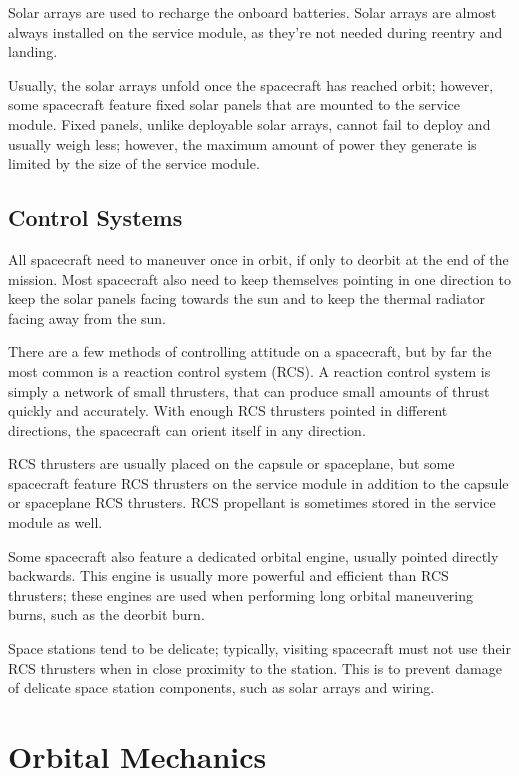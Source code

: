 \documentclass[oneside,a5paper]{book}
\begin{document}
Solar arrays are used to recharge the onboard batteries. Solar arrays
are almost always installed on the service module, as they’re not
needed during reentry and landing.

Usually, the solar arrays unfold once the spacecraft has reached
orbit; however, some spacecraft feature fixed solar panels that are
mounted to the service module. Fixed panels, unlike deployable solar
arrays, cannot fail to deploy and usually weigh less; however, the
maximum amount of power they generate is limited by the size of the
service module.

\section{Control Systems}

All spacecraft need to maneuver once in orbit, if only to deorbit at
the end of the mission. Most spacecraft also need to keep themselves
pointing in one direction to keep the solar panels facing towards the
sun and to keep the thermal radiator facing away from the sun.

There are a few methods of controlling attitude on a spacecraft, but
by far the most common is a reaction control system (RCS). A reaction
control system is simply a network of small thrusters, that can
produce small amounts of thrust quickly and accurately. With enough
RCS thrusters pointed in different directions, the spacecraft can
orient itself in any direction.

RCS thrusters are usually placed on the capsule or spaceplane, but
some spacecraft feature RCS thrusters on the service module in
addition to the capsule or spaceplane RCS thrusters. RCS propellant is
sometimes stored in the service module as well.

Some spacecraft also feature a dedicated orbital engine, usually
pointed directly backwards. This engine is usually more powerful and
efficient than RCS thrusters; these engines are used when performing
long orbital maneuvering burns, such as the deorbit burn.

Space stations tend to be delicate; typically, visiting spacecraft
must not use their RCS thrusters when in close proximity to the
station. This is to prevent damage of delicate space station
components, such as solar arrays and wiring.

\chapter{Orbital Mechanics}
\end{document}
